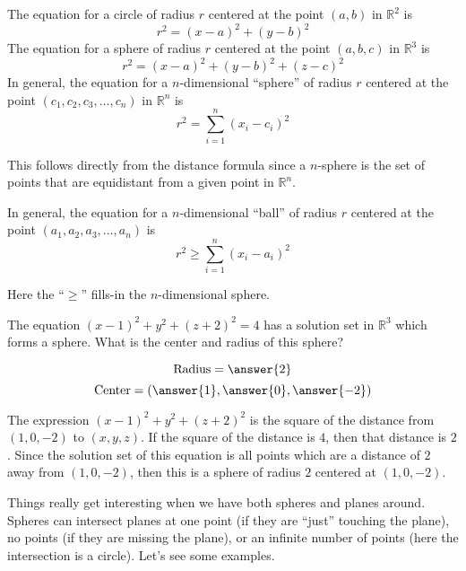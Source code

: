 \documentclass{ximera}
\begin{document}
\begin{theorem}
  The equation for a circle of radius $r$ centered at the point
  $(a,b)$ in $\mathbb{R}^2$ is
  \[
  r^2=(x-a)^2 + (y-b)^2
  \]
  The equation for a sphere of radius $r$ centered at the point
  $(a,b,c)$ in $\mathbb{R}^3$ is
  \[
  r^2 = (x-a)^2 + (y-b)^2 + (z-c)^2
  \]
  In general, the equation for a $n$-dimensional ``sphere'' of radius
  $r$ centered at the point $(c_1,c_2,c_3,\dots,c_n)$ in $\mathbb{R}^n$ is
  \[
  r^2 = \sum_{i=1}^n(x_i-c_i)^2
  \]
  \begin{explanation}
    This follows directly from the distance formula since a $n$-sphere
    is the set of points that are equidistant from a given point in
    $\mathbb{R}^n$.
  \end{explanation}
\end{theorem}

\begin{corollary}
  In general, the equation for a $n$-dimensional ``ball'' of radius
  $r$ centered at the point $(a_1,a_2,a_3,\dots,a_n)$ is
  \[
  r^2 \ge \sum_{i=1}^n(x_i-a_i)^2
  \]
  \begin{explanation}
    Here the ``$\ge$'' fills-in the $n$-dimensional sphere.
  \end{explanation}
\end{corollary}


\begin{question}
  The equation $(x-1)^2+y^2+(z+2)^2 = 4$ has a solution set in
  $\mathbb{R}^3$ which forms a sphere.  What is the center and
  radius of this sphere?
  \begin{prompt}
  \[
  \text{Radius} = \answer{2}
  \]
  \[
  \text{Center} = \left(\answer{1},\answer{0}, \answer{-2} \right)
  \]
  \end{prompt}
  \begin{hint}
    The expression $(x-1)^2+y^2+(z+2)^2$ is the square of the distance
    from $(1,0,-2)$ to $(x,y,z)$.  If the square of the distance is
    $4$, then that distance is $2$.  Since the solution set of this
    equation is all points which are a distance of $2$ away from
    $(1,0,-2)$, then this is a sphere of radius $2$ centered at
    $(1,0,-2)$.
  \end{hint}
\end{question}

Things really get interesting when we have both spheres and planes
around. Spheres can intersect planes at one point (if they are
``just'' touching the plane), no points (if they are missing the
plane), or an infinite number of points (here the intersection is a
circle). Let's see some examples. 
\end{document}
